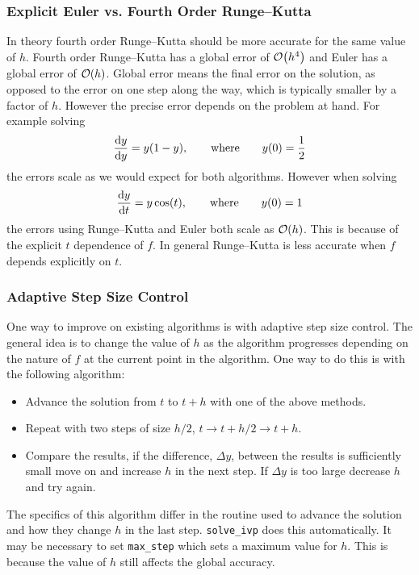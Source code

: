 \documentclass[a4paper]{article}
\begin{document}
    
    \subsubsection{Explicit Euler vs. Fourth Order Runge--Kutta}
    In theory fourth order Runge--Kutta should be more accurate for the same value of \(h\).
    Fourth order Runge--Kutta has a global error of \(\order{h^4}\) and Euler has a global error of \(\order{h}\).
    Global error means the final error on the solution, as opposed to the error on one step along the way, which is typically smaller by a factor of \(h\).
    However the precise error depends on the problem at hand.
    For example solving
    \[\dv{y}{y} = y(1 - y), \qquad\text{where}\qquad y(0) = \frac{1}{2}\]
    the errors scale as we would expect for both algorithms.
    However when solving
    \[\dv{y}{t} = y\cos(t),\qquad\text{where}\qquad y(0) = 1\]
    the errors using Runge--Kutta and Euler both scale as \(\order{h}\).
    This is because of the explicit \(t\) dependence of \(f\).
    In general Runge--Kutta is less accurate when \(f\) depends explicitly on \(t\).
    
    \subsubsection{Adaptive Step Size Control}
    One way to improve on existing algorithms is with adaptive step size control.
    The general idea is to change the value of \(h\) as the algorithm progresses depending on the nature of \(f\) at the current point in the algorithm.
    One way to do this is with the following algorithm:
    \begin{itemize}
        \item Advance the solution from \(t\) to \(t + h\) with one of the above methods.
        \item Repeat with two steps of size \(h/2\), \(t \to t + h/2 \to t + h\).
        \item Compare the results, if the difference, \(\Delta y\), between the results is sufficiently small move on and increase \(h\) in the next step.
        If \(\Delta y\) is too large decrease \(h\) and try again.
    \end{itemize}
    The specifics of this algorithm differ in the routine used to advance the solution and how they change \(h\) in the last step.
    \lstinline[language=python]|solve_ivp| does this automatically.
    It may be necessary to set \lstinline[language=python]|max_step| which sets a maximum value for \(h\).
    This is because the value of \(h\) still affects the global accuracy.
    
\end{document}
